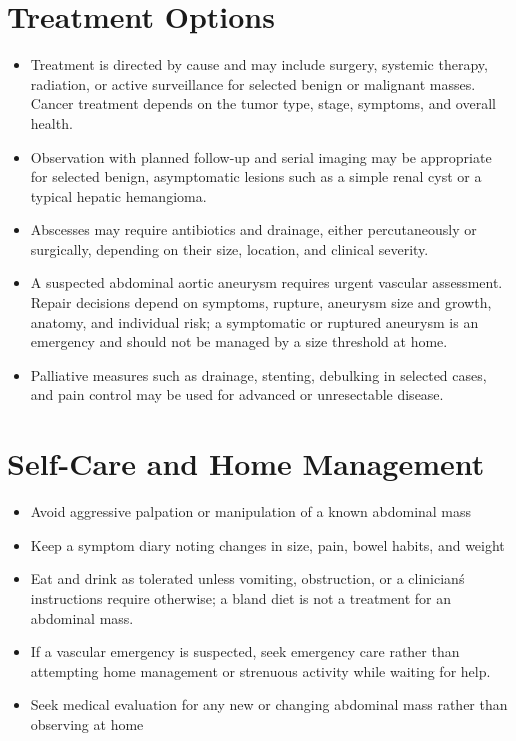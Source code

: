 \section*{Treatment Options}
\begin{itemize}
 \item Treatment is directed by cause and may include surgery, systemic therapy, radiation, or active surveillance for selected benign or malignant masses. Cancer treatment depends on the tumor type, stage, symptoms, and overall health.
 \item Observation with planned follow-up and serial imaging may be appropriate for selected benign, asymptomatic lesions such as a simple renal cyst or a typical hepatic hemangioma.
 \item Abscesses may require antibiotics and drainage, either percutaneously or surgically, depending on their size, location, and clinical severity.
 \item A suspected abdominal aortic aneurysm requires urgent vascular assessment. Repair decisions depend on symptoms, rupture, aneurysm size and growth, anatomy, and individual risk; a symptomatic or ruptured aneurysm is an emergency and should not be managed by a size threshold at home.
 \item Palliative measures such as drainage, stenting, debulking in selected cases, and pain control may be used for advanced or unresectable disease.
\end{itemize}

\section*{Self-Care and Home Management}
\begin{itemize}
 \item Avoid aggressive palpation or manipulation of a known abdominal mass
 \item Keep a symptom diary noting changes in size, pain, bowel habits, and weight
 \item Eat and drink as tolerated unless vomiting, obstruction, or a clinician\'s instructions require otherwise; a bland diet is not a treatment for an abdominal mass.
 \item If a vascular emergency is suspected, seek emergency care rather than attempting home management or strenuous activity while waiting for help.
 \item Seek medical evaluation for any new or changing abdominal mass rather than observing at home
\end{itemize}

